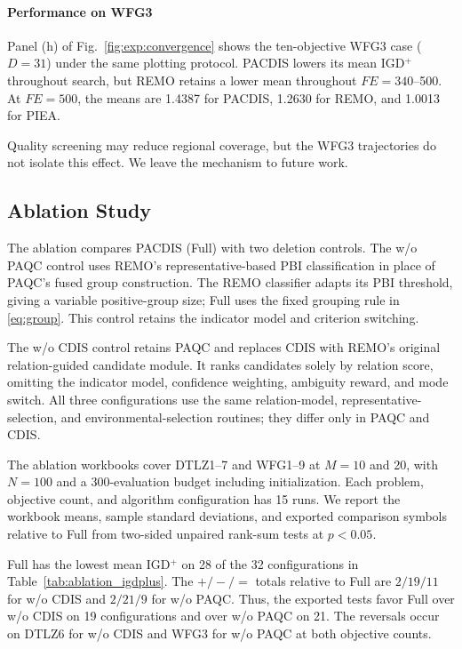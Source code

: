 \documentclass[final,5p,times,twocolumn]{elsarticle}
\begin{document}


\paragraph{Performance on WFG3}
Panel (h) of Fig.~\ref{fig:exp:convergence} shows the ten-objective WFG3 case
($D=31$) under the same plotting protocol. PACDIS lowers its mean IGD$^+$
throughout search, but REMO retains a lower mean throughout $FE=340$--500.
At $FE=500$, the means are 1.4387 for PACDIS, 1.2630 for REMO, and 1.0013 for
PIEA.

Quality screening may reduce regional coverage, but the WFG3 trajectories do
not isolate this effect. We leave the mechanism to future work.

\subsection{Ablation Study}
\label{sec:exp:ablation}

The ablation compares PACDIS (Full) with two deletion controls.
The w/o PAQC control uses REMO's representative-based PBI
classification in place of PAQC's fused group construction. The REMO
classifier adapts its PBI threshold, giving a variable positive-group size;
Full uses the fixed grouping rule in \eqref{eq:group}. This control retains the indicator model and
criterion switching.

The w/o CDIS control retains PAQC and replaces CDIS with REMO's original
relation-guided candidate module. It ranks candidates solely by relation score,
omitting the indicator model, confidence weighting, ambiguity reward, and
mode switch. All three configurations use the same relation-model,
representative-selection, and environmental-selection routines; they differ
only in PAQC and CDIS.

The ablation workbooks cover DTLZ1--7 and WFG1--9 at $M=10$ and 20,
with $N=100$ and a 300-evaluation budget including initialization. Each
problem, objective count, and algorithm configuration has 15 runs. We report
the workbook means, sample standard deviations, and exported comparison
symbols relative to Full from two-sided unpaired rank-sum tests at $p<0.05$.

Full has the lowest mean IGD$^+$ on 28 of the 32 configurations in
Table~\ref{tab:ablation_igdplus}. The $+/-/=$ totals relative to Full are
$2/19/11$ for w/o CDIS and $2/21/9$ for w/o PAQC.
Thus, the exported tests favor Full over w/o CDIS on 19 configurations and
over w/o PAQC on 21. The reversals occur on DTLZ6 for w/o CDIS and WFG3 for
w/o PAQC at both objective counts.
\end{document}
